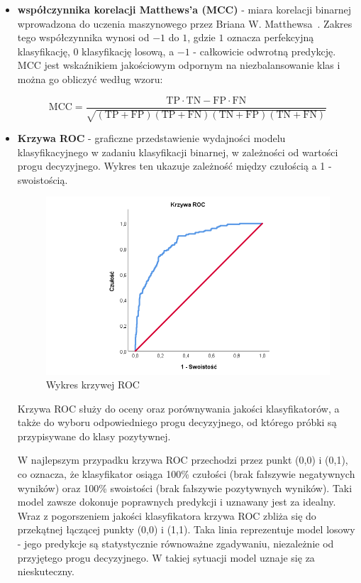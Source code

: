 \documentclass[a4paper,twoside,12pt]{book}
\begin{document}
\begin{itemize}
	\item \textbf{współczynnika korelacji Matthews'a (MCC)} - miara korelacji binarnej wprowadzona do uczenia maszynowego przez Briana W. Matthewsa~\cite{matthews1975}. Zakres tego współczynnika wynosi od $-1$ do $1$, gdzie $1$ oznacza perfekcyjną klasyfikację, $0$ klasyfikację losową, a $-1$ - całkowicie odwrotną predykcję. MCC jest wskaźnikiem jakościowym odpornym na niezbalansowanie klas i można go obliczyć według wzoru:

	      \begin{equation}
		      \text{MCC} = \frac{\text{TP} \cdot \text{TN} - \text{FP} \cdot \text{FN}}{\sqrt{(\text{TP} + \text{FP})(\text{TP} + \text{FN})(\text{TN} + \text{FP})(\text{TN} + \text{FN})}}
	      \end{equation}

	\item \textbf{Krzywa ROC} \cite{altman1994, brown2006roc, fawcett2006} - graficzne przedstawienie wydajności modelu klasyfikacyjnego w zadaniu klasyfikacji binarnej, w zależności od wartości progu decyzyjnego. Wykres ten ukazuje zależność między czułością a 1 - swoistością.

	      \begin{figure}[!h]
		      \centering
		      \includegraphics[width=1\textwidth]{img/r4/Krzywa_ROC.png}
		      \caption{Wykres krzywej ROC \cite{solecki2025roc}}
		      \label{fig:etykieta-rysunku}
	      \end{figure}

	      Krzywa ROC służy do oceny oraz porównywania jakości klasyfikatorów, a także do wyboru odpowiedniego progu decyzyjnego, od którego próbki są przypisywane do klasy pozytywnej.

	      W najlepszym przypadku krzywa ROC przechodzi przez punkt (0,0) i (0,1), co oznacza, że klasyfikator osiąga 100\% czułości (brak fałszywie negatywnych wyników) oraz 100\% swoistości (brak fałszywie pozytywnych wyników). Taki model zawsze dokonuje poprawnych predykcji i uznawany jest za idealny.
	      \newpage
	      Wraz z pogorszeniem jakości klasyfikatora krzywa ROC zbliża się do przekątnej łączącej punkty (0,0) i (1,1). Taka linia reprezentuje model losowy - jego predykcje są statystycznie równoważne zgadywaniu, niezależnie od przyjętego progu decyzyjnego. W takiej sytuacji model uznaje się za nieskuteczny.


\end{itemize}
\end{document}
